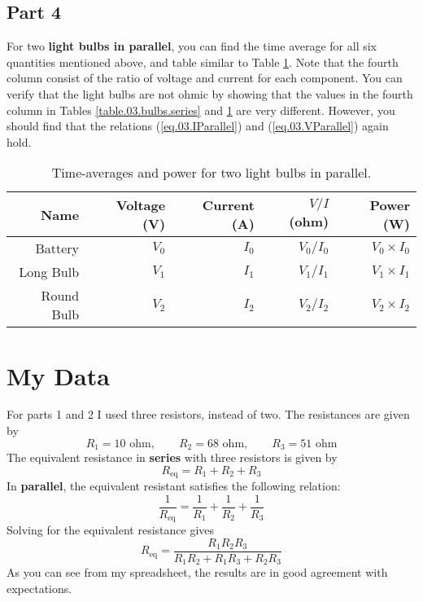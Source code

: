 \subsection{Part 4}
For two \textbf{light bulbs in parallel}, you can find the time average for all six quantities mentioned above, and table similar to Table \ref{table.03.bulbs.parallel}. Note that the fourth column consist of the ratio of voltage and current for each component. You can verify that the light bulbs are not ohmic by showing that the values in the fourth column in Tables \ref{table.03.bulbs.series} and \ref{table.03.bulbs.parallel} are very different. However, you should find that the relations (\ref{eq.03.IParallel}) and (\ref{eq.03.VParallel}) again hold.
\begin{table}[ht!]
	\begin{center}
		\begin{tabular}{|r|r|r|r|r|}
			\hline
			Name & Voltage (V) & Current (A) & $V/I$ (ohm) & Power (W) \\
			\hline
			Battery & $V_{0}$ & $I_{0}$ & $V_{0} / I_{0}$ & $V_{0} \times I_{0}$ \\
			Long Bulb & $V_{1}$ & $I_{1}$ & $V_{1} / I_{1}$ & $V_{1} \times I_{1}$ \\
			Round Bulb & $V_{2}$ & $I_{2}$ & $V_{2} / I_{2}$ & $V_{2} \times I_{2}$ \\
			\hline
		\end{tabular}
	\end{center}
	\caption{Time-averages and power for two light bulbs in parallel.}
	\label{table.03.bulbs.parallel}
\end{table}
\section{My Data}
For parts 1 and 2 I used three resistors, instead of two. The resistances are given by
\begin{equation}
	R_{1} = 10 \text{ ohm}, \qquad R_{2} = 68 \text{ ohm}, \qquad R_{3} = 51 \text{ ohm}
\end{equation}
The equivalent resistance in \textbf{series} with three resistors is given by
\begin{equation}
	R_{\text{eq}} = R_{1} + R_{2} + R_{3}
\end{equation}
In \textbf{parallel}, the equivalent resistant satisfies the following relation:
\begin{equation}
	\frac{1}{R_{\text{eq}}} = \frac{1}{R_{1}} + \frac{1}{R_{2}} + \frac{1}{R_{3}}
\end{equation}
Solving for the equivalent resistance gives
\begin{equation}
	R_{\text{eq}} = \frac{R_{1} R_{2} R_{3}}{R_{1} R_{2} + R_{1} R_{3} + R_{2} R_{3}}
\end{equation}
As you can see from my spreadsheet, the results are in good agreement with expectations.

